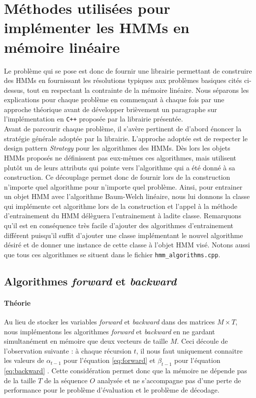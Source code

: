 \documentclass[letterpaper]{article}
\begin{document}
\section{Méthodes utilisées pour implémenter les HMMs en mémoire linéaire}
Le problème qui se pose est donc de fournir une librairie permettant de construire des HMMs en fournissant les résolutions typiques aux problèmes basiques cités ci-dessus, tout en respectant la contrainte de la mémoire linéaire. Nous séparons les explications pour chaque problème en commençant à chaque fois par une approche théorique avant de développer brièvement un paragraphe sur l'implémentation en \texttt{C++} proposée par la librairie présentée. \\

Avant de parcourir chaque problème, il s'avère pertinent de d'abord énoncer la stratégie générale adoptée par la librairie. L'approche adoptée est de respecter le design pattern \textit{Strategy} pour les algorithmes des HMMs. Dès lors les objets HMMs proposés ne définissent pas eux-mêmes ces algorithmes, mais utilisent plutôt un de leurs attributs qui pointe vers l'algorithme qui a été donné à sa construction. Ce découplage permet donc de fournir lors de la construction n'importe quel algorithme pour n'importe quel problème. Ainsi, pour entrainer un objet HMM avec l'algorithme Baum-Welch linéaire, nous lui donnons la classe qui implémente cet algorithme lors de la construction et l'appel à la méthode d'entrainement du HMM délèguera l'entrainement à ladite classe. Remarquons qu'il est en conséquence très facile d'ajouter des algorithmes d'entrainement différent puisqu'il suffit d'ajouter une classe implémentant le nouvel algorithme désiré et de donner une instance de cette classe à l'objet HMM visé.  Notons aussi que tous ces algorithmes se situent dans le fichier \texttt{hmm\_algorithms.cpp}. 

\subsection{Algorithmes \textit{forward} et \textit{backward}}
\paragraph{Théorie}
Au lieu de stocker les variables \textit{forward} et \textit{backward} dans des matrices $M \times T$, nous implémentons les algorithmes \textit{forward} et \textit{backward} en ne gardant simultanément en mémoire que deux vecteurs de taille $M$. Ceci découle de l'observation suivante : à chaque récursion $t$, il nous faut uniquement connaitre les valeurs de $\alpha_{t-1}$ pour l'équation \ref{eq:forward} et $\beta_{t-1}$ pour l'équation \ref{eq:backward} \citep{MM}. Cette considération permet donc que la mémoire ne dépende pas de la taille $T$ de la séquence $O$ analysée et ne s'accompagne pas d'une perte de performance pour le problème d'évaluation et le problème de décodage.
\end{document}
